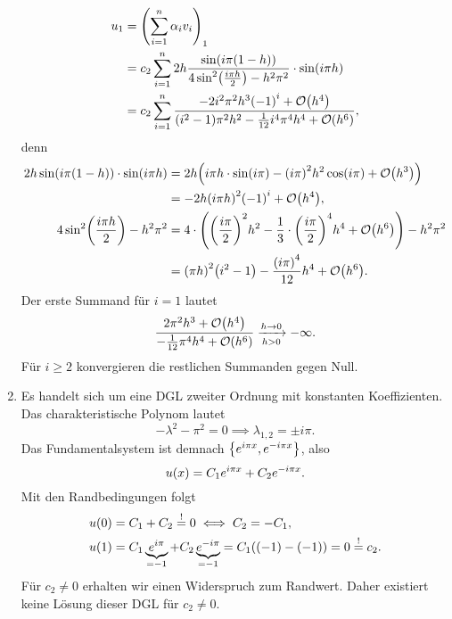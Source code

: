 \documentclass{exercise}
\begin{document}
\begin{enumerate}
        \begin{align*}
            u_1 &= \parentheses*{\sum_{i = 1}^n \alpha_i v_i}_1\\
            &= c_2\sum_{i = 1}^n 2h\frac{\sin\parentheses*{i\pi\parentheses*{1 - h}}}{4\sin^2\parentheses*{\frac{i\pi h}{2}} - h^2 \pi^2} \cdot \sin\parentheses*{i\pi h}\\
            &= c_2\sum_{i = 1}^n \frac{-2i^2 \pi^2 h^3\parentheses*{-1}^i + \mathcal{O}\parentheses*{h^4}}{\parentheses*{i^2 - 1}\pi^2 h^2 - \frac{1}{12}i^4 \pi^4 h^4 + \mathcal{O}\parentheses*{h^6}},
        \end{align*}
        denn
        \begin{align*}
            2h\sin\parentheses*{i\pi\parentheses*{1 - h}} \cdot \sin\parentheses*{i\pi h} &= 2h\parentheses*{i\pi h \cdot \sin\parentheses*{i\pi} - \parentheses*{i\pi}^2 h^2\cos\parentheses*{i\pi} + \mathcal{O}\parentheses*{h^3}}\\
            &= -2h\parentheses*{i\pi h}^2\parentheses*{-1}^i + \mathcal{O}\parentheses*{h^4},\\
            4\sin^2\parentheses*{\frac{i\pi h}{2}} - h^2 \pi^2 &= 4 \cdot \parentheses*{\parentheses*{\frac{i\pi}{2}}^2 h^2 - \frac{1}{3} \cdot \parentheses*{\frac{i\pi}{2}}^4 h^4 + \mathcal{O}\parentheses*{h^6}} - h^2 \pi^2\\
            &= \parentheses*{\pi h}^2 \parentheses*{i^2 - 1} - \frac{\parentheses*{i\pi}^4}{12}h^4 + \mathcal{O}\parentheses*{h^6}.
        \end{align*}
        Der erste Summand für \(i = 1\) lautet
        \[
            \frac{2\pi^2 h^3 + \mathcal{O}\parentheses*{h^4}}{-\frac{1}{12}\pi^4 h^4 + \mathcal{O}\parentheses*{h^6}} \xrightarrow[h > 0]{h \to 0} -\infty.
        \]
        Für \(i \ge 2\) konvergieren die restlichen Summanden gegen Null.
        \item Es handelt sich um eine DGL zweiter Ordnung mit konstanten Koeffizienten.
        Das charakteristische Polynom lautet
        \[
            -\lambda^2 - \pi^2 = 0 \implies \lambda_{1, 2} = \pm i\pi.
        \]
        Das Fundamentalsystem ist demnach \(\braces*{e^{i\pi x}, e^{-i\pi x}}\), also
        \[
            u\parentheses*{x} = C_1 e^{i\pi x} + C_2 e^{-i\pi x}.
        \]
        Mit den Randbedingungen folgt
        \begin{align*}
            u\parentheses*{0} &= C_1 + C_2 \stackrel{!}{=} 0 \iff C_2 = -C_1,\\
            u\parentheses*{1} &= C_1 \underbrace{e^{i\pi}}_{= -1} + C_2 \underbrace{e^{-i\pi}}_{= -1} = C_1\parentheses*{\parentheses*{-1} - \parentheses*{-1}} = 0 \stackrel{!}{=} c_2.
        \end{align*}
        Für \(c_2 \ne 0\) erhalten wir einen Widerspruch zum Randwert.
        Daher existiert keine Lösung dieser DGL für \(c_2 \ne 0\).
    \end{enumerate}
\end{document}
